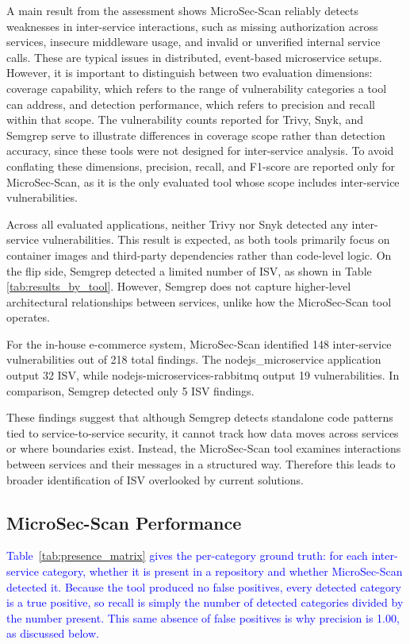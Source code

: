\documentclass[preprint,12pt]{elsarticle}
\newcommand{\new}[1]{\textcolor{blue}{#1}}
\begin{document}
A main result from the assessment shows MicroSec-Scan reliably detects weaknesses in inter-service interactions, such as missing authorization across services, insecure middleware usage, and invalid or unverified internal service calls. These are typical issues in distributed, event-based microservice setups. However, it is important to distinguish between two evaluation dimensions: coverage capability, which refers to the range of vulnerability categories a tool can address, and detection performance, which refers to precision and recall within that scope. The vulnerability counts reported for Trivy, Snyk, and Semgrep serve to illustrate differences in coverage scope rather than detection accuracy, since these tools were not designed for inter-service analysis. To avoid conflating these dimensions, precision, recall, and F1-score are reported only for MicroSec-Scan, as it is the only evaluated tool whose scope includes inter-service vulnerabilities.

Across all evaluated applications, neither Trivy nor Snyk detected any inter-service vulnerabilities. This result is expected, as both tools primarily focus on container images and third-party dependencies rather than code-level logic. On the flip side, Semgrep detected a limited number of ISV, as shown in Table \ref{tab:results_by_tool}. However, Semgrep does not capture higher-level architectural relationships between services, unlike how the MicroSec-Scan tool operates.

For the in-house e-commerce system, MicroSec-Scan identified 148 inter-service vulnerabilities out of 218 total findings. The nodejs\_microservice application output 32 ISV, while nodejs-microservices-rabbitmq output 19 vulnerabilities. In comparison, Semgrep detected only 5 ISV findings.

These findings suggest that although Semgrep detects standalone code patterns tied to service-to-service security, it cannot track how data moves across services or where boundaries exist. Instead, the MicroSec-Scan tool examines interactions between services and their messages in a structured way. Therefore this leads to broader identification of ISV overlooked by current solutions.


\subsection{MicroSec-Scan Performance}

\new{Table~\ref{tab:presence_matrix} gives the per-category ground truth: for each inter-service category, whether it is present in a repository and whether MicroSec-Scan detected it. Because the tool produced no false positives, every detected category is a true positive, so recall is simply the number of detected categories divided by the number present. This same absence of false positives is why precision is 1.00, as discussed below.}
\end{document}
